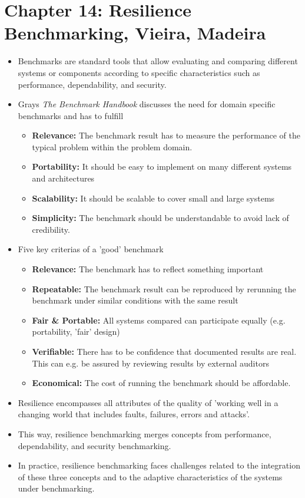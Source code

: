 \section{Chapter 14: Resilience Benchmarking, Vieira, Madeira}

\begin{itemize}
  \item Benchmarks are standard tools that allow evaluating and comparing different systems or components according to specific characteristics such as performance, dependability, and security.
  \item Grays \textit{The Benchmark Handbook} discusses the need for domain specific benchmarks and has to fulfill
  \begin{itemize}
  	\item \textbf{Relevance:} The benchmark result has to measure the performance of the typical problem within the problem domain. 
  	\item \textbf{Portability:} It should be easy to implement on many different systems and architectures
  	\item \textbf{Scalability:} It should be scalable to cover small and large systems
  	\item \textbf{Simplicity:} The benchmark should be understandable to avoid lack of credibility. 
  \end{itemize}
  \item Five key criterias of a 'good' benchmark
  \begin{itemize}
  	\item \textbf{Relevance:} The benchmark has to reflect something important
  	\item \textbf{Repeatable:} The benchmark result can be reproduced by rerunning the benchmark under similar conditions with the same result
  	\item \textbf{Fair \& Portable:} All systems compared can participate equally (e.g. portability, 'fair' design)
  	\item \textbf{Verifiable:} There has to be confidence that documented results are real. This can e.g. be assured by reviewing results by external auditors
  	\item \textbf{Economical:} The cost of running the benchmark should be affordable. 
  \end{itemize}
  \item Resilience encompasses all attributes of the quality of 'working well in a changing world that includes faults, failures, errors and attacks'. 
  \item This way, resilience benchmarking merges concepts from performance, dependability, and security benchmarking.
  \item In practice, resilience benchmarking faces challenges related to the integration of these three concepts and to the adaptive characteristics of the systems under benchmarking.
\end{itemize}

